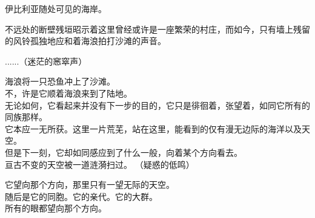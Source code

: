 \documentclass[openany]{book}
\begin{document}
伊比利亚随处可见的海岸。\par
不远处的断壁残垣昭示着这里曾经或许是一座繁荣的村庄，而如今，只有墙上残留的风铃孤独地应和着海浪拍打沙滩的声音。

\begin{dialogue}
     ......（迷茫的窸窣声）\par
    海浪将一只恐鱼冲上了沙滩。\\
    不，许是它顺着海浪来到了陆地。\\
    无论如何，它看起来并没有下一步的目的，它只是徘徊着，张望着，如同它所有的同族那样。\\
    它本应一无所获。这里一片荒芜，站在这里，能看到的仅有漫无边际的海洋以及天空。\\
    但是下一刻，它却如同感应到了什么一般，向着某个方向看去。\\
    亘古不变的天空被一道涟漪扫过。
     （疑惑的低鸣）\par
    它望向那个方向，那里只有一望无际的天空。\\
    随后是它的同胞。它的亲代。它的大群。\\
    所有的眼都望向那个方向。
\end{dialogue}\par
\end{document}
